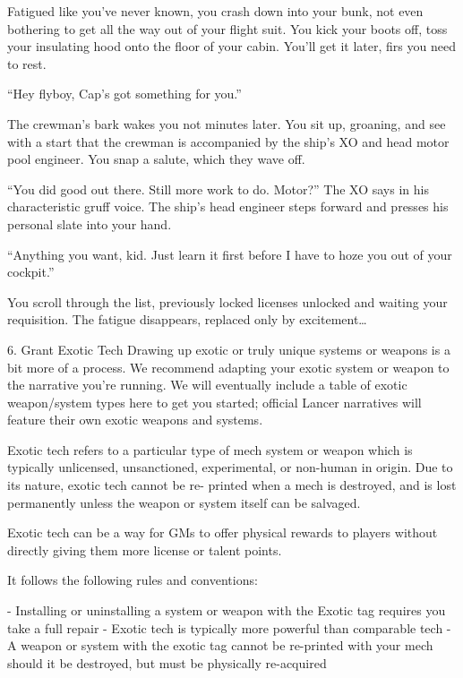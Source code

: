 Fatigued like you’ve never known, you crash down into your bunk, not even bothering to get all  
the way out of your flight suit. You kick your boots off, toss your insulating hood onto the floor of  
your cabin. You’ll get it later, firs you need to rest.   

“Hey flyboy, Cap’s got something for you.”   

The crewman’s bark wakes you not minutes later. You sit up, groaning, and see with a start that  
the crewman is accompanied by the ship’s XO and head motor pool engineer. You snap a salute,  
which they wave off.   

“You did good out there. Still more work to do. Motor?” The XO says in his characteristic gruff  
voice. The ship’s head engineer steps forward and presses his personal slate into your hand.   

“Anything you want, kid. Just learn it first before I have to hoze you out of your cockpit.”   

                                                                                                           


You scroll through the list, previously locked licenses unlocked and waiting your requisition. The  
fatigue disappears, replaced only by excitement…  

6. Grant Exotic Tech  
Drawing up exotic or truly unique systems or weapons is a bit more of a process. We  
recommend adapting your exotic system or weapon to the narrative you’re running. We will  
eventually include a table of exotic weapon/system types here to get you started; official Lancer  
narratives will feature their own exotic weapons and systems. 
 

Exotic tech refers to a particular type of mech system or weapon which is typically unlicensed,  
unsanctioned, experimental, or non-human in origin. Due to its nature, exotic tech cannot be re- 
printed when a mech is destroyed, and is lost permanently unless the weapon or system itself  
can be salvaged.
 

Exotic tech can be a way for GMs to offer physical rewards to players without directly giving  
them more license or talent points.
 

 It follows the following rules and conventions:
 
    -    Installing or uninstalling a system or weapon with the Exotic tag requires you take a full  
         repair  
    -    Exotic tech is typically more powerful than comparable tech  
    -    A weapon or system with the exotic tag cannot be re-printed with your mech should it  
         be destroyed, but must be physically re-acquired  


